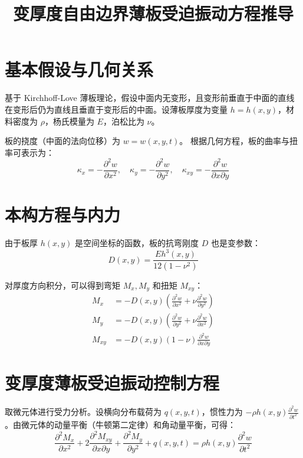 \documentclass[a4paper,12pt]{ctexart}
\title{变厚度自由边界薄板受迫振动方程推导}
\author{}
\date{}
\begin{document}
\maketitle

\section{基本假设与几何关系}
基于 Kirchhoff-Love 薄板理论，假设中面内无变形，且变形前垂直于中面的直线在变形后仍为直线且垂直于变形后的中面。设薄板厚度为变量 $h = h(x,y)$，材料密度为 $\rho$，杨氏模量为 $E$，泊松比为 $\nu$。

板的挠度（中面的法向位移）为 $w = w(x,y,t)$。
根据几何方程，板的曲率与扭率可表示为：
\begin{equation}
    \kappa_x = -\frac{\partial^2 w}{\partial x^2}, \quad
    \kappa_y = -\frac{\partial^2 w}{\partial y^2}, \quad
    \kappa_{xy} = -\frac{\partial^2 w}{\partial x \partial y}
\end{equation}

\section{本构方程与内力}
由于板厚 $h(x,y)$ 是空间坐标的函数，板的抗弯刚度 $D$ 也是变参数：
\begin{equation}
    D(x,y) = \frac{E h^3(x,y)}{12(1-\nu^2)}
\end{equation}

对厚度方向积分，可以得到弯矩 $M_x, M_y$ 和扭矩 $M_{xy}$：
\begin{equation}
    \begin{aligned}
        M_x &= -D(x,y) \left( \frac{\partial^2 w}{\partial x^2} + \nu \frac{\partial^2 w}{\partial y^2} \right) \\
        M_y &= -D(x,y) \left( \frac{\partial^2 w}{\partial y^2} + \nu \frac{\partial^2 w}{\partial x^2} \right) \\
        M_{xy} &= -D(x,y) (1-\nu) \frac{\partial^2 w}{\partial x \partial y}
    \end{aligned}
\end{equation}

\section{变厚度薄板受迫振动控制方程}
取微元体进行受力分析。设横向分布载荷为 $q(x,y,t)$，惯性力为 $-\rho h(x,y) \frac{\partial^2 w}{\partial t^2}$。由微元体的动量平衡（牛顿第二定律）和角动量平衡，可得：
\begin{equation}
    \frac{\partial^2 M_x}{\partial x^2} + 2\frac{\partial^2 M_{xy}}{\partial x \partial y} + \frac{\partial^2 M_y}{\partial y^2} + q(x,y,t) = \rho h(x,y) \frac{\partial^2 w}{\partial t^2}
\end{equation}
\end{document}
